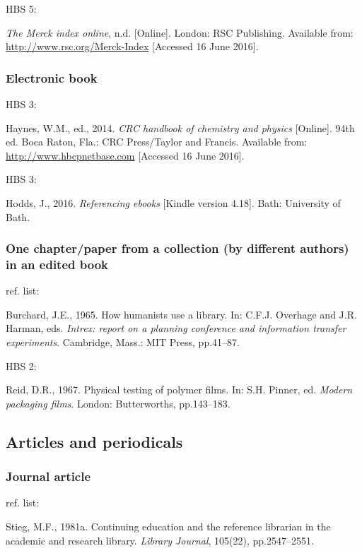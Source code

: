 HBS 5: \cite{merckNDidx}

\emph{The Merck index online}, n.d. [Online]. London: RSC Publishing. Available from: \url{http://www.rsc.org/Merck-Index} [Accessed 16 June 2016].



\subsubsection*{Electronic book}

HBS 3: \cite{haynes2014crc}

Haynes, W.M., ed., 2014. \emph{CRC handbook of chemistry and physics} [Online]. 94th ed. Boca Raton, Fla.: CRC Press/Taylor and Francis. Available from: \url{http://www.hbcpnetbase.com} [Accessed 16 June 2016].


HBS 3: \cite{hodds2016re}

Hodds, J., 2016. \emph{Referencing ebooks} [Kindle version 4.18]. Bath: University of Bath.



\subsubsection*{One chapter\slash paper from a collection (by different authors) in an edited book}

ref. list: \cite{burchard1965hhl}

Burchard, J.E., 1965. How humanists use a library. In: C.F.J. Overhage and J.R. Harman, eds. \emph{Intrex: report on a planning conference and information transfer experiments}. Cambridge, Mass.: MIT Press, pp.41--87.


HBS 2: \cite{reid1967ptp}

Reid, D.R., 1967. Physical testing of polymer films. In: S.H. Pinner, ed. \emph{Modern packaging films}. London: Butterworths, pp.143--183.



\subsection{Articles and periodicals}

\subsubsection*{Journal article}

ref. list: \cite{stieg1981cer}

Stieg, M.F., 1981a. Continuing education and the reference librarian in the academic and research library. \emph{Library Journal}, 105(22), pp.2547--2551.

